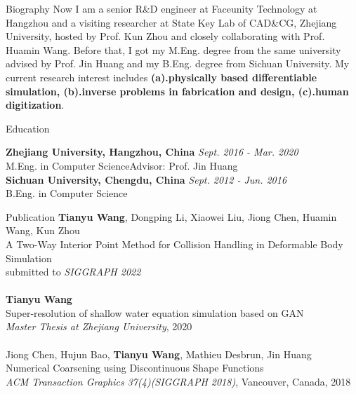 \documentclass{resume} %
\begin{document}
\begin{rSection}{Biography}
  Now I am a senior R\&D engineer at Faceunity Technology at Hangzhou and a visiting researcher at State Key Lab of CAD\&CG, Zhejiang University, hosted by Prof. Kun Zhou and closely collaborating with Prof. Huamin Wang. Before that, I got my M.Eng. degree from the same university advised by Prof. Jin Huang and my B.Eng. degree from Sichuan University. My current research interest includes \textbf{(a).physically based differentiable simulation, (b).inverse problems in fabrication and design, (c).human digitization}.
\end{rSection}

\begin{rSection}{Education}

{\bf Zhejiang University, Hangzhou, China} \hfill {\em Sept. 2016 - Mar. 2020} 
\\ M.Eng. in Computer Science\hfill {Advisor: Prof. Jin Huang} 
\\{\bf Sichuan University, Chengdu, China} \hfill {\em Sept. 2012 - Jun. 2016} 
\\ B.Eng. in Computer Science\hfill {}

\end{rSection}

\begin{rSection}{Publication}
  {\textbf{Tianyu Wang}, Dongping Li, Xiaowei Liu, Jiong Chen, Huamin Wang, Kun Zhou\\ A Two-Way Interior Point Method for Collision Handling in Deformable Body Simulation\\ submitted to \emph{SIGGRAPH 2022}}
  \\ \\{\textbf{Tianyu Wang}\\Super-resolution of shallow water equation simulation based on GAN\\\emph{Master Thesis at Zhejiang University}, 2020}
  \\ \\{Jiong Chen, Hujun Bao, \textbf{Tianyu Wang}, Mathieu Desbrun, Jin Huang\\Numerical Coarsening using Discontinuous Shape Functions\\\emph{ACM Transaction Graphics 37(4)(SIGGRAPH 2018)}, Vancouver, Canada, 2018}
\end{rSection}
\end{document}
